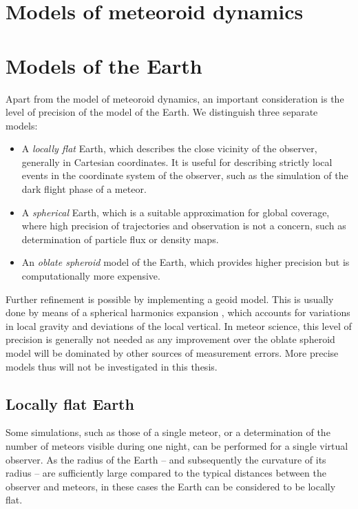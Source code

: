 



\section{Models of meteoroid dynamics} \label{mm}





\section{Models of the Earth}
    Apart from the model of meteoroid dynamics, an important consideration is the level of precision
    of the model of the Earth. We distinguish three separate models:

    \begin{itemize}
        \item A \emph{locally flat} Earth, which describes the close vicinity of the observer,
            generally in Cartesian coordinates. It is useful for describing strictly local events
            in the coordinate system of the observer, such as the simulation of the dark flight phase of a meteor.
        \item A \emph{spherical} Earth, which is a suitable approximation for global coverage,
            where high precision of trajectories and observation is not a concern, such as determination
            of particle flux or density maps.
        \item An \emph{oblate spheroid} model of the Earth, which provides higher
            precision but is computationally more expensive.
    \end{itemize}

    Further refinement is possible by implementing a geoid model. This is usually done by means of
    a spherical harmonics expansion \cite{???}, which accounts for variations in local gravity
    and deviations of the local vertical.
    In meteor science, this level of precision is generally not needed as any improvement over the
    oblate spheroid model will be dominated by other sources of measurement errors.
    More precise models thus will not be investigated in this thesis.


    \subsection{Locally flat Earth} \label{mmf}
        Some simulations, such as those of a single meteor, or a determination of
        the number of meteors visible during one night, can be performed for a single virtual observer.
        As the radius of the Earth -- and subsequently the curvature of its radius -- are
        sufficiently large compared to the typical distances between the observer and meteors,
        in these cases the Earth can be considered to be locally flat.

